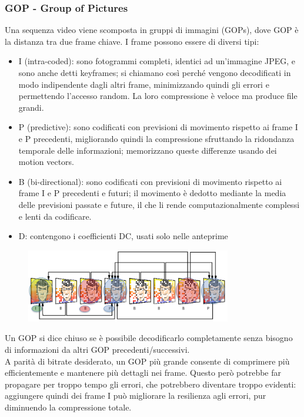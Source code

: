 \documentclass[a4paper,11pt]{article} %
\begin{document}
\subsubsection{GOP - Group of Pictures}
Una sequenza video viene scomposta in gruppi di immagini (GOPs), dove GOP è la distanza tra due frame chiave. I frame possono essere di diversi tipi: 
\begin{itemize}
\item I (intra-coded): sono fotogrammi completi, identici ad un'immagine JPEG, e sono anche detti keyframes; si chiamano così perché vengono decodificati in modo indipendente dagli altri frame, minimizzando quindi gli errori e permettendo l'accesso random. La loro compressione è veloce ma produce file grandi.
\item P (predictive): sono codificati con previsioni di movimento rispetto ai frame I e P precedenti, migliorando quindi la compressione sfruttando la ridondanza temporale delle informazioni; memorizzano queste differenze usando dei motion vectors.
\item B (bi-directional): sono codificati con previsioni di movimento rispetto ai frame I e P precedenti e futuri; il movimento è dedotto mediante la media delle previsioni passate e future, il che li rende computazionalmente complessi e lenti da codificare.
\item D: contengono i coefficienti DC, usati solo nelle anteprime
\end{itemize}
\begin{figure} [h]
\centering
\includegraphics[width=0.8\textwidth]{IPB frames}
\end{figure}

Un GOP si dice chiuso se è possibile decodificarlo completamente senza bisogno di informazioni da altri GOP precedenti/successivi.\\
A parità di bitrate desiderato, un GOP più grande consente di comprimere più efficientemente e mantenere più dettagli nei frame. Questo però potrebbe far propagare per troppo tempo gli errori, che potrebbero diventare troppo evidenti: aggiungere quindi dei frame I può migliorare la resilienza agli errori, pur diminuendo la compressione totale. 
\end{document}
